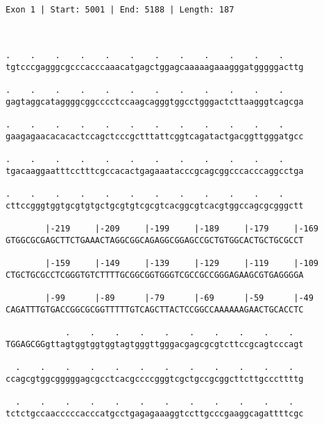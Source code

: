 \documentclass{article}
\begin{document}
 \begin{Verbatim}
 
Exon 1 | Start: 5001 | End: 5188 | Length: 187



.    .    .    .    .    .    .    .    .    .    .    .    
tgtcccgagggcgcccacccaaacatgagctggagcaaaaagaaagggatgggggacttg
                                                            
.    .    .    .    .    .    .    .    .    .    .    .    
gagtaggcataggggcggcccctccaagcagggtggcctgggactcttaagggtcagcga
                                                            
.    .    .    .    .    .    .    .    .    .    .    .    
gaagagaacacacactccagctcccgctttattcggtcagatactgacggttgggatgcc
                                                            
.    .    .    .    .    .    .    .    .    .    .    .    
tgacaaggaatttcctttcgccacactgagaaatacccgcagcggcccacccaggcctga
                                                            
.    .    .    .    .    .    .    .    .    .    .    .    
cttccgggtggtgcgtgtgctgcgtgtcgcgtcacggcgtcacgtggccagcgcgggctt
                                                            
        |-219     |-209     |-199     |-189     |-179     |-169
GTGGCGCGAGCTTCTGAAACTAGGCGGCAGAGGCGGAGCCGCTGTGGCACTGCTGCGCCT
                                                            
        |-159     |-149     |-139     |-129     |-119     |-109
CTGCTGCGCCTCGGGTGTCTTTTGCGGCGGTGGGTCGCCGCCGGGAGAAGCGTGAGGGGA
                                                            
        |-99      |-89      |-79      |-69      |-59      |-49
CAGATTTGTGACCGGCGCGGTTTTTGTCAGCTTACTCCGGCCAAAAAAGAACTGCACCTC
                                                            
            .    .    .    .    .    .    .    .    .    .  
TGGAGCGGgttagtggtggtggtagtgggttgggacgagcgcgtcttccgcagtcccagt
                                                            
  .    .    .    .    .    .    .    .    .    .    .    .  
ccagcgtggcgggggagcgcctcacgccccgggtcgctgccgcggcttcttgcccttttg
                                                            
  .    .    .    .    .    .    .    .    .    .    .    .  
tctctgccaacccccacccatgcctgagagaaaggtccttgcccgaaggcagattttcgc
                                                            

\end{Verbatim}
\end{document}
